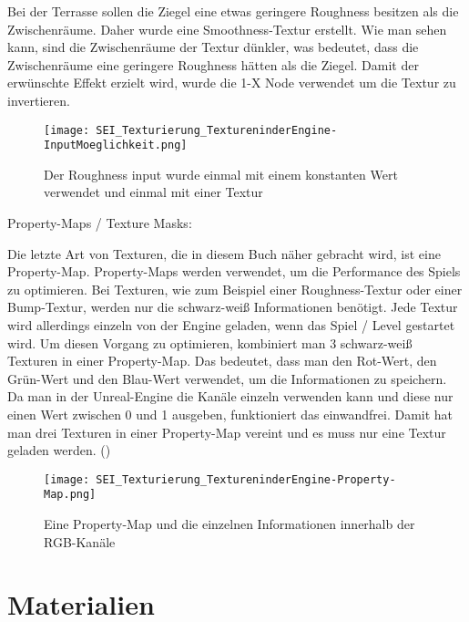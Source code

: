 {Bei der Terrasse sollen die Ziegel eine etwas geringere Roughness besitzen als die Zwischenräume. Daher wurde eine
Smoothness-Textur erstellt. Wie man sehen kann, sind die Zwischenräume der Textur dünkler, was bedeutet, dass die
Zwischenräume eine geringere Roughness hätten als die Ziegel. Damit der erwünschte Effekt erzielt wird, wurde die
1-X Node verwendet um die Textur zu invertieren.

\begin{figure}[H]
    \centering
    \texttt{[image: SEI\_Texturierung\_TextureninderEngine-InputMoeglichkeit.png]}
    \caption{Der Roughness input wurde einmal mit einem konstanten Wert verwendet und einmal mit einer Textur}
    \label{picture:tex_mat_roughness}
\end{figure}


Property-Maps / Texture Masks\citep{ue:tex_property_map}:

Die letzte Art von Texturen, die in diesem Buch näher gebracht wird, ist eine Property-Map. Property-Maps werden
verwendet, um die Performance des Spiels zu optimieren. Bei Texturen, wie zum Beispiel einer Roughness-Textur oder einer
Bump-Textur, werden nur die schwarz-weiß Informationen benötigt. Jede Textur wird allerdings einzeln von der Engine
geladen, wenn das Spiel / Level gestartet wird. Um diesen Vorgang zu optimieren, kombiniert man 3 schwarz-weiß Texturen
in einer Property-Map. Das bedeutet, dass man den Rot-Wert, den Grün-Wert und den Blau-Wert verwendet, um die
Informationen zu speichern. Da man in der Unreal-Engine die Kanäle einzeln verwenden kann und diese nur einen Wert
zwischen 0 und 1 ausgeben, funktioniert das einwandfrei. Damit hat man drei Texturen in einer
Property-Map vereint und es muss nur eine Textur geladen werden. ()

\begin{figure}[H]
    \centering
    \texttt{[image: SEI\_Texturierung\_TextureninderEngine-Property-Map.png]}
    \caption{Eine Property-Map und die einzelnen Informationen innerhalb der RGB-Kanäle}
    \label{picture:property_map}
\end{figure}


\section{Materialien}
\label{sec:materials}

}
